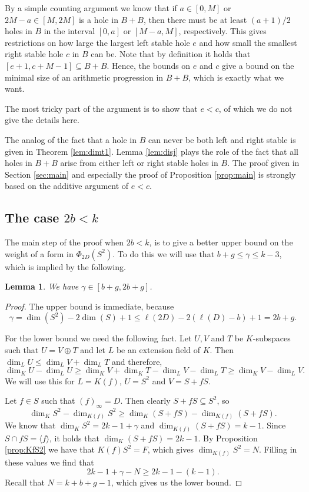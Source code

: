 \documentclass[12pt]{amsart}
\renewcommand{\leq}{\leqslant}
\renewcommand{\geq}{\geqslant}
\newtheorem{lemma}[theorem]{Lemma}
\theoremstyle{definition}
\begin{document}
	By a simple counting argument we know that if $a \in [0, M]$ or $2M - a \in [M, 2M]$ is a hole in $B+B$, then there must be at least $(a+1)/2$ holes in $B$ in the interval $[0, a]$ or $[M-a, M]$, respectively. This gives restrictions on how large the largest left stable hole $e$ and how small the smallest right stable hole $c$ in $B$ can be. Note that by definition it holds that $[e+1, c + M -1] \subseteq B+B$. Hence, the bounds on $e$ and $c$ give a bound on the minimal size of an arithmetic progression in $B+B$, which is exactly what we want.
	
	The most tricky part of the argument is to show that $e < c$, of which we do not give the details here. 
	
	The analog of the fact that a hole in $B$ can never be both left and right stable is given in Theorem \ref{lem:dimt1}. Lemma \ref{lem:disj} plays the role of the fact that all holes in $B+B$ arise from either left or right stable holes in $B$. The proof given in Section \ref{sec:main} and especially the proof of Proposition \ref{prop:main} is strongly based on the additive argument of $e<c$.
	\subsection{The case $2b < k$} 
	The main step of the proof when $2b < k$, is to give a better upper bound on the weight of a form in $\Phi_{2D}(S^2)$. To do this we will use that $b+g \leq \gamma \leq k-3$, which is implied by the following. 
	\begin{lemma}\label{lem:gammabound}
		We have $\gamma \in [b + g, 2b + g]$.
	\end{lemma}
	\begin{proof}
		The upper bound is immediate, because
		$$\gamma = \dim(S^2) - 2\dim(S) + 1 \leq \ell(2D) - 2(\ell(D) - b) + 1 = 2b + g.$$ 
		
		For the lower bound we need the following fact. Let $U, V$ and $T$ be $K$-subspaces such that $U = V \oplus T$ and let $L$ be an extension field of $K$. Then $\dim_L U \leq \dim_L V + \dim_L T$ and therefore,
		$$\dim_K U - \dim_L U \geq \dim_K V + \dim_K T - \dim_L V - \dim_L T \geq \dim_K V - \dim_L V.$$ 
		We will use this for $L = K(f)$, $U = S^2$ and $V = S + fS$. 
		
		Let $f \in S$ such that $(f)_\infty = D$. Then clearly $S + fS \subseteq S^2$, so
		\begin{equation*} \label{eq:dims}
			\dim_K S^2 - \dim_{K(f)} S^2 \geq \dim_K (S + fS) - \dim_{K(f)} (S+ fS).
		\end{equation*} 
		We know that $\dim_K S^2 = 2k - 1 + \gamma$ and $\dim_{K(f)} (S + fS) = k - 1$. Since $S \cap fS = \langle f \rangle$, it holds that $\dim_K (S + fS) = 2k-1$.  By Proposition \ref{prop:KfS2} we have that $K(f)S^2 = F$, which gives $\dim_{K(f)} S^2 = N$. Filling in these values we find that
		$$ 2k - 1 + \gamma - N \geq 2k - 1 - (k-1).$$ 
		Recall that $N = k + b + g - 1$, which gives us the lower bound. 
	\end{proof}
	
\end{document}
